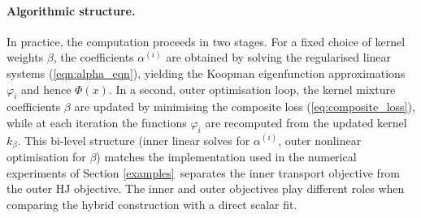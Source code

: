\documentclass[11pt]{article}
\theoremstyle{plain}      %
\theoremstyle{definition} %
\providecommand{\DIFaddtex}[1]{{\protect\color{blue}#1}} %
\providecommand{\DIFdeltex}[1]{{\protect\color{red}#1}} %
\providecommand{\DIFaddbegin}{} %
\providecommand{\DIFaddend}{} %
\providecommand{\DIFdelbegin}{} %
\providecommand{\DIFdelend}{} %
\providecommand{\DIFadd}[1]{\texorpdfstring{\DIFaddtex{#1}}{#1}} %
\providecommand{\DIFdel}[1]{\texorpdfstring{\DIFdeltex{#1}}{}} %
\newcommand{\DIFscaledelfig}{1.0}
\newlength{\DIFdelgraphicswidth} %
\newlength{\DIFdelgraphicsheight} %
\newcommand{\DIFaddincludegraphics}[2][]{{\color{blue}\fbox{\DIFOincludegraphics[#1]{#2}}}} %
\newcommand{\DIFdelincludegraphics}[2][]{%
\sbox{\DIFdelgraphicsbox}{\DIFOincludegraphics[#1]{#2}}%
\settoboxwidth{\DIFdelgraphicswidth}{\DIFdelgraphicsbox} %
\settoboxtotalheight{\DIFdelgraphicsheight}{\DIFdelgraphicsbox} %
\scalebox{\DIFscaledelfig}{%
\parbox[b]{\DIFdelgraphicswidth}{\usebox{\DIFdelgraphicsbox}\\[-\baselineskip] \rule{\DIFdelgraphicswidth}{0em}}\llap{\resizebox{\DIFdelgraphicswidth}{\DIFdelgraphicsheight}{%
\setlength{\unitlength}{\DIFdelgraphicswidth}%
\begin{picture}(1,1)%
\thicklines\linethickness{2pt} %
{\color[rgb]{1,0,0}\put(0,0){\framebox(1,1){}}}%
{\color[rgb]{1,0,0}\put(0,0){\line( 1,1){1}}}%
{\color[rgb]{1,0,0}\put(0,1){\line(1,-1){1}}}%
\end{picture}%
}\hspace*{3pt}}} %
} %
\DeclareRobustCommand{\DIFaddbegin}{\DIFOaddbegin \let\includegraphics\DIFaddincludegraphics} %
\DeclareRobustCommand{\DIFaddend}{\DIFOaddend \let\includegraphics\DIFOincludegraphics} %
\DeclareRobustCommand{\DIFdelbegin}{\DIFOdelbegin \let\includegraphics\DIFdelincludegraphics} %
\DeclareRobustCommand{\DIFdelend}{\DIFOaddend \let\includegraphics\DIFOincludegraphics} %
\begin{document}
\DIFaddend \paragraph{Algorithmic structure.}
In practice, the computation proceeds in two stages. For a fixed choice of kernel weights $\beta$, the coefficients $\alpha^{(i)}$ are obtained by solving the regularised linear systems (\ref{eqn:alpha_eqn}), yielding the Koopman eigenfunction approximations $\varphi_i$ and hence $\Phi(x)$.  In a second, outer optimisation loop, the kernel mixture coefficients $\beta$ are updated by minimising the composite loss (\ref{eq:composite_loss}), while at each iteration the functions $\varphi_i$ are recomputed from the updated kernel $k_\beta$.  This bi-level structure \DIFdelbegin \DIFdel{(inner linear solves for $\alpha^{(i)}$, outer nonlinear optimisation for $\beta$) matches the implementation used in the numerical experiments of Section \ref{examples}}\DIFdelend\ \DIFaddbegin \DIFadd{separates the inner transport objective from the outer HJ objective. The inner and outer objectives play different roles when comparing the hybrid construction with a direct scalar fit}\DIFaddend .
\end{document}
